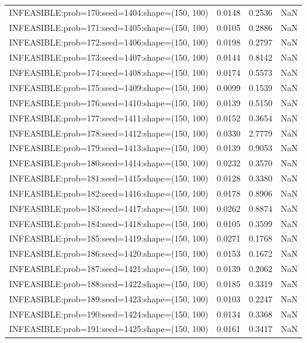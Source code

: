 \begin{longtable}{lccc}
INFEASIBLE:prob=170:seed=1404:shape=(150, 100) &   0.0148 &  0.2536 &    NaN \\
INFEASIBLE:prob=171:seed=1405:shape=(150, 100) &   0.0105 &  0.2886 &    NaN \\
INFEASIBLE:prob=172:seed=1406:shape=(150, 100) &   0.0198 &  0.2797 &    NaN \\
INFEASIBLE:prob=173:seed=1407:shape=(150, 100) &   0.0144 &  0.8142 &    NaN \\
INFEASIBLE:prob=174:seed=1408:shape=(150, 100) &   0.0174 &  0.5573 &    NaN \\
INFEASIBLE:prob=175:seed=1409:shape=(150, 100) &   0.0099 &  0.1539 &    NaN \\
INFEASIBLE:prob=176:seed=1410:shape=(150, 100) &   0.0139 &  0.5150 &    NaN \\
INFEASIBLE:prob=177:seed=1411:shape=(150, 100) &   0.0152 &  0.3654 &    NaN \\
INFEASIBLE:prob=178:seed=1412:shape=(150, 100) &   0.0330 &  2.7779 &    NaN \\
INFEASIBLE:prob=179:seed=1413:shape=(150, 100) &   0.0139 &  0.9053 &    NaN \\
INFEASIBLE:prob=180:seed=1414:shape=(150, 100) &   0.0232 &  0.3570 &    NaN \\
INFEASIBLE:prob=181:seed=1415:shape=(150, 100) &   0.0128 &  0.3380 &    NaN \\
INFEASIBLE:prob=182:seed=1416:shape=(150, 100) &   0.0178 &  0.8906 &    NaN \\
INFEASIBLE:prob=183:seed=1417:shape=(150, 100) &   0.0262 &  0.8874 &    NaN \\
INFEASIBLE:prob=184:seed=1418:shape=(150, 100) &   0.0105 &  0.3599 &    NaN \\
INFEASIBLE:prob=185:seed=1419:shape=(150, 100) &   0.0271 &  0.1768 &    NaN \\
INFEASIBLE:prob=186:seed=1420:shape=(150, 100) &   0.0153 &  0.1672 &    NaN \\
INFEASIBLE:prob=187:seed=1421:shape=(150, 100) &   0.0139 &  0.2062 &    NaN \\
INFEASIBLE:prob=188:seed=1422:shape=(150, 100) &   0.0185 &  0.3319 &    NaN \\
INFEASIBLE:prob=189:seed=1423:shape=(150, 100) &   0.0103 &  0.2247 &    NaN \\
INFEASIBLE:prob=190:seed=1424:shape=(150, 100) &   0.0134 &  0.3368 &    NaN \\
INFEASIBLE:prob=191:seed=1425:shape=(150, 100) &   0.0161 &  0.3417 &    NaN \\

\end{longtable}
